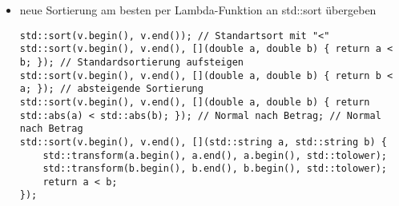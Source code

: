\documentclass[a4paper]{scrartcl}
\theoremstyle{definition}
\theoremstyle{plain}
\theoremstyle{remark}
\theoremstyle{remark}
\begin{document}
\begin{itemize}
\begin{itemize}
\item neue Sortierung am besten per Lambda-Funktion an std::sort übergeben
\begin{verbatim}
std::sort(v.begin(), v.end()); // Standartsort mit "<"
std::sort(v.begin(), v.end(), [](double a, double b) { return a < b; }); // Standardsortierung aufsteigen
std::sort(v.begin(), v.end(), [](double a, double b) { return b < a; }); // absteigende Sortierung
std::sort(v.begin(), v.end(), [](double a, double b) { return std::abs(a) < std::abs(b); }); // Normal nach Betrag; // Normal nach Betrag
std::sort(v.begin(), v.end(), [](std::string a, std::string b) {
	std::transform(a.begin(), a.end(), a.begin(), std::tolower);
	std::transform(b.begin(), b.end(), b.begin(), std::tolower);
	return a < b;
});
\end{verbatim}
\end{itemize}
\end{itemize}
\end{document}
